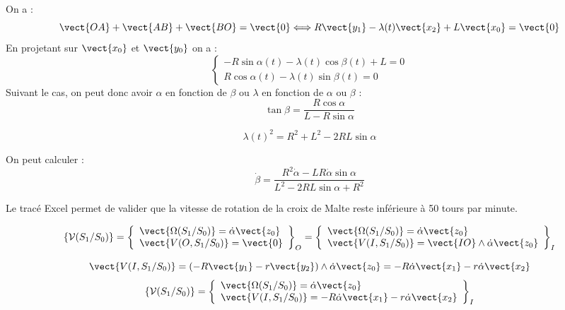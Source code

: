 

\ifprof%
\begin{corrige}

On a :
$$ \vect{OA} + \vect{AB} + \vect{BO} = \vect{0} \Longleftrightarrow 
R\vect{y_1} - \lambda(t)\vect{x_2} + L \vect{x_0} = \vect{0}
$$
En projetant sur $\vect{x_0}$ et $\vect{y_0}$ on a :
$$
\left\{
\begin{array}{l}
- R \sin \alpha(t) - \lambda(t) \cos\beta(t) + L = 0\\
R\cos\alpha(t) - \lambda(t)\sin \beta(t)=0
\end{array}
\right.
$$
Suivant le cas, on peut donc avoir $\alpha$ en fonction de $\beta$ ou $\lambda$ en fonction de $\alpha$ ou $\beta$ :
$$
\tan \beta = \dfrac{R\cos\alpha}{L-R\sin\alpha}
$$

$$
\lambda(t)^2 = R^2 + L^2 - 2RL \sin\alpha
$$
\end{corrige}
\else \fi



\ifprof%
\begin{corrige}

On peut calculer : 
$$
\dot{\beta} = \dfrac{R^2\dot{\alpha} - LR\dot{\alpha}\sin\alpha }{L^2-2RL\sin\alpha + R^2}
$$

Le tracé Excel permet de valider que la vitesse de rotation de la croix de Malte reste inférieure à 50 tours par minute.

\end{corrige}
\else \fi



\ifprof%
\begin{corrige}

$$\{\mathcal{V}(S_1/S_0)\} = 
\left\{
\begin{array}{l}
\vect{\Omega(S_1/S_0)} = \dot{\alpha}\vect{z_0} \\
\vect{V(O,S_1/S_0)} = \vect{0}
\end{array}
\right\}_O =
\left\{
\begin{array}{l}
\vect{\Omega(S_1/S_0)} = \dot{\alpha}\vect{z_0} \\
\vect{V(I,S_1/S_0)} = \vect{IO} \wedge \dot{\alpha}\vect{z_0}
\end{array}
\right\}_I
$$

$$
\vect{V(I,S_1/S_0)} =\left( -R\vect{y_1} - r \vect{y_2} \right) \wedge \dot{\alpha}\vect{z_0} =- R\dot{\alpha}\vect{x_1} - r\dot{\alpha}\vect{x_2}
$$
$$\{\mathcal{V}(S_1/S_0)\} = 
\left\{
\begin{array}{l}
\vect{\Omega(S_1/S_0)} = \dot{\alpha}\vect{z_0} \\
\vect{V(I,S_1/S_0)} = -R\dot{\alpha}\vect{x_1} - r\dot{\alpha}\vect{x_2}
\end{array}
\right\}_I
$$

\end{corrige}
\else \fi

